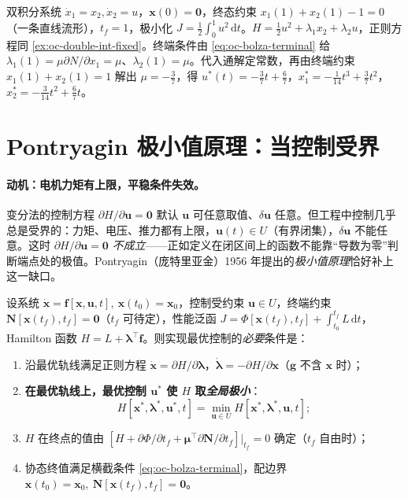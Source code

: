 \begin{example}[终态受约束的最省能量]\label{ex:oc-bolza}
双积分系统 $\dot x_1=x_2,\dot x_2=u$，$\mathbf x(0)=\mathbf0$，终态约束 $x_1(1)+x_2(1)-1=0$（一条直线流形），$t_f=1$，极小化 $J=\tfrac12\int_0^1u^2\,\mathrm dt$。$H=\tfrac12u^2+\lambda_1x_2+\lambda_2u$，正则方程同 \cref{ex:oc-double-int-fixed}。终端条件由 \cref{eq:oc-bolza-terminal} 给 $\lambda_1(1)=\mu\partial N/\partial x_1=\mu$、$\lambda_2(1)=\mu$。代入通解定常数，再由终端约束 $x_1(1)+x_2(1)=1$ 解出 $\mu=-\tfrac37$，得 $u^*(t)=-\tfrac37t+\tfrac67$，$x_1^*=-\tfrac1{14}t^3+\tfrac37t^2$，$x_2^*=-\tfrac3{14}t^2+\tfrac67t$。
\end{example}

\section{Pontryagin 极小值原理：当控制受界}
\label{sec:oc-pmp}

\paragraph{动机：电机力矩有上限，平稳条件失效。}
变分法的控制方程 $\partial H/\partial\mathbf u=\mathbf0$ 默认 $\mathbf u$ 可任意取值、$\delta\mathbf u$ 任意。但工程中控制几乎总是受界的：力矩、电压、推力都有上限，$\mathbf u(t)\in U$（有界闭集），$\delta\mathbf u$ 不能任意。这时 $\partial H/\partial\mathbf u=\mathbf0$ \emph{不成立}——正如定义在闭区间上的函数不能靠“导数为零”判断端点处的极值\cite{liubao2006modern}。Pontryagin（庞特里亚金）1956 年提出的\emph{极小值原理}恰好补上这一缺口\cite{pontryagin1962mathematical}。

\begin{theorem}\label{thm:oc-pmp}
设系统 $\dot{\mathbf x}=\mathbf f[\mathbf x,\mathbf u,t],\ \mathbf x(t_0)=\mathbf x_0$，控制受约束 $\mathbf u\in U$，终端约束 $\mathbf N[\mathbf x(t_f),t_f]=\mathbf0$（$t_f$ 可待定），性能泛函 $J=\Phi[\mathbf x(t_f),t_f]+\int_{t_0}^{t_f}L\,\mathrm dt$，Hamilton 函数 $H=L+\boldsymbol\lambda^\top\mathbf f$。则实现最优控制的\emph{必要}条件是：
\begin{enumerate}
  \item 沿最优轨线满足正则方程 $\dot{\mathbf x}=\partial H/\partial\boldsymbol\lambda$，$\dot{\boldsymbol\lambda}=-\partial H/\partial\mathbf x$（$\mathbf g$ 不含 $\mathbf x$ 时）；
  \item \textbf{在最优轨线上，最优控制 $\mathbf u^*$ 使 $H$ 取\emph{全局极小}}：
  \begin{equation}
    \boxed{H[\mathbf x^*,\boldsymbol\lambda^*,\mathbf u^*,t]=\min_{\mathbf u\in U}H[\mathbf x^*,\boldsymbol\lambda^*,\mathbf u,t];}
    \label{eq:oc-pmp-min}
  \end{equation}
  \item $H$ 在终点的值由 $[H+\partial\Phi/\partial t_f+\boldsymbol\mu^\top\partial\mathbf N/\partial t_f]|_{t_f}=0$ 确定（$t_f$ 自由时）；
  \item 协态终值满足横截条件 \cref{eq:oc-bolza-terminal}，配边界 $\mathbf x(t_0)=\mathbf x_0,\ \mathbf N[\mathbf x(t_f),t_f]=\mathbf0$。
\end{enumerate}
\end{theorem}

